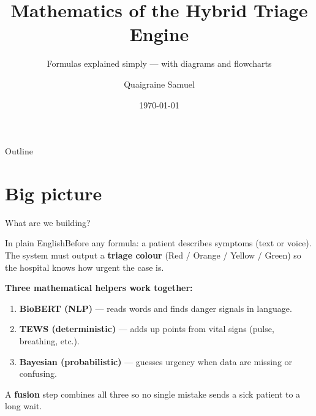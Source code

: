 \documentclass[aspectratio=169,11pt]{beamer}
\title[Hybrid Triage Math Spec]{Mathematics of the Hybrid Triage Engine}
\subtitle{Formulas explained simply --- with diagrams and flowcharts}
\author{Quaigraine Samuel}
\institute{Department of Mathematics\\Kwame Nkrumah University of Science and Technology}
\date{\today}
\newcommand{\plain}[1]{\begin{block}{In plain English}\small #1\end{block}}
\begin{document}
\begin{frame}
	\titlepage
\end{frame}

\begin{frame}{Outline}
	\tableofcontents[hideallsubsections]
\end{frame}

\section{Big picture}

\begin{frame}{What are we building?}
	\plain{Before any formula: a patient describes symptoms (text or voice). The system must output a \textbf{triage colour} (Red / Orange / Yellow / Green) so the hospital knows how urgent the case is.}

	\vspace{0.3em}
	\textbf{Three mathematical helpers work together:}
	\begin{enumerate}
		\item \textbf{BioBERT (NLP)} --- reads words and finds danger signals in language.
		\item \textbf{TEWS (deterministic)} --- adds up points from vital signs (pulse, breathing, etc.).
		\item \textbf{Bayesian (probabilistic)} --- guesses urgency when data are missing or confusing.
	\end{enumerate}

	A \textbf{fusion} step combines all three so no single mistake sends a sick patient to a long wait.
\end{frame}
\end{document}
